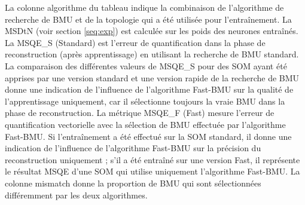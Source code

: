 	La colonne algorithme du tableau indique la combinaison de l'algorithme de recherche de BMU et de la topologie qui a été utilisée pour l'entraînement. La MSDtN (voir section \ref{seq:exp}) est calculée sur les poids des neurones entraînés. La MSQE\_S (Standard) est l'erreur de quantification dans la phase de reconstruction (après apprentissage) en utilisant la recherche de BMU standard. La comparaison des différentes valeurs de MSQE\_S pour des SOM ayant été apprises par une version standard et une version rapide de la recherche de BMU donne une indication de l'influence de l'algorithme Fast-BMU sur la qualité de l'apprentissage uniquement, car il sélectionne toujours la vraie BMU dans la phase de reconstruction. La métrique MSQE\_F (Fast) mesure l'erreur de quantification vectorielle avec la sélection de BMU effectuée par l'algorithme Fast-BMU. Si l'entraînement a été effectué sur la SOM standard, il donne une indication de l'influence de l'algorithme Fast-BMU sur la précision du reconstruction uniquement ; s'il a été entraîné sur une version Fast, il représente le résultat MSQE d'une SOM qui utilise uniquement l'algorithme Fast-BMU. La colonne mismatch donne la proportion de BMU qui sont sélectionnées différemment par les deux algorithmes.

